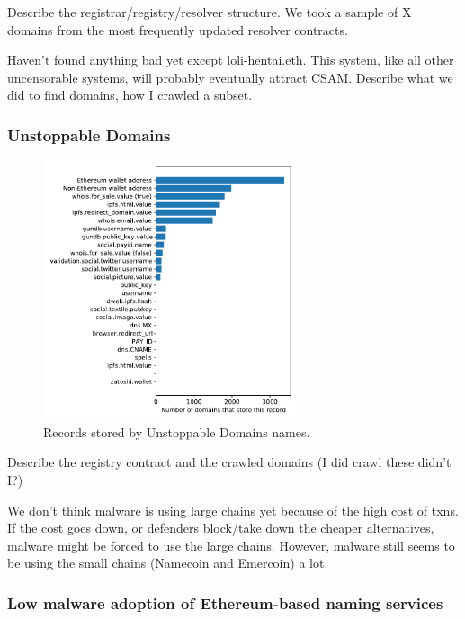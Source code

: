 \documentclass[10pt,sigconf,letterpaper]{acmart}
\begin{document}
Describe the registrar/registry/resolver structure. We took a sample 
of X domains from the most 
frequently updated resolver contracts.

Haven't found anything bad yet except loli-hentai.eth. This 
system, like all other uncensorable systems, will probably 
eventually attract CSAM. Describe what we did to find 
domains, how I crawled a subset.

\subsubsection{Unstoppable Domains}

\begin{figure}[t]
	\centering
	\includegraphics[width=3in]{figs/all_unstoppable_records.pdf}
	\caption{Records stored by Unstoppable Domains names.}
	\label{fig:unstoppable_records}
\end{figure}

Describe the registry contract and the crawled domains (I did 
crawl these didn't I?)

We don't think malware is using large chains yet because of 
the high cost of txns. If the cost goes down, or defenders 
block/take down the cheaper alternatives, malware might be 
forced to use the large chains. However, malware still seems 
to be using the small chains (Namecoin and Emercoin) a lot.

\subsubsection{Low malware adoption of Ethereum-based naming services}
\end{document}
